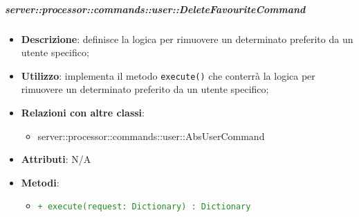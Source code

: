         \subparagraph{server::processor::commands::user::DeleteFavouriteCommand} %
        \label{subp:bdsm_app_server_processor_commands_user_deletefavouritecommand}
        \begin{itemize}
          \item \textbf{Descrizione}: definisce la logica per rimuovere un determinato preferito da un utente specifico;
          \item \textbf{Utilizzo}: implementa il metodo \texttt{execute()} che conterrà la logica per rimuovere un determinato preferito da un utente specifico;
          \item \textbf{Relazioni con altre classi}:
            \begin{itemize}
              \item server::processor::commands::user::AbsUserCommand
            \end{itemize}
          \item \textbf{Attributi}: N/A
          \item \textbf{Metodi}:
          \begin{itemize}
              \item \textcolor{forestgreen}{\texttt{+ execute(request: Dictionary) : Dictionary}}
          \end{itemize}
        \end{itemize}


